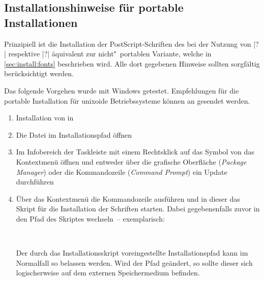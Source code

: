 \subsection{Installationshinweise für portable Installationen}
%
%

Prinzipiell ist die Installation der PostScript-Schriften des \CDs bei der 
Nutzung von |?| respektive  
|?| äquivalent zur nicht"~portablen 
Variante, welche in \autoref{sec:install:fonts} beschrieben wird. Alle dort 
gegebenen Hinweise sollten sorgfältig berücksichtigt werden.

Das folgende Vorgehen wurde mit Windows getestet. Empfehlungen für die portable 
Installation für unixoide Betriebssysteme können an \mailto{\tudscrmail} 
gesendet werden.
\begin{enumerate}
\item Installation von  in 
\item Die Datei  im Installationspfad öffnen
\item Im Infobereich der Taskleiste mit einem Rechtsklick auf das Symbol von 
   das Kontextmenü öffnen und entweder 
  über die grafische Oberfläche (\emph{Package Manager}) oder die Kommandozeile 
  (\emph{Command Prompt}) ein Update durchführen
\item Über das Kontextmenü die Kommandozeile ausführen und in dieser das Skript 
  für die Installation der Schriften  starten. 
  Dabei gegebenenfalls zuvor in den Pfad des Skriptes wechseln~-- exemplarisch:
  \begin{quoting}[leftmargin=1.5em,rightmargin=0pt]
  \newline%
  \,
  \end{quoting}
  Der durch das Installationsskript voreingestellte Installationspfad kann im 
  Normalfall so belassen werden. Wird der Pfad geändert, so sollte dieser sich 
  logischerweise auf dem externen Speichermedium 
   befinden.
\end{enumerate}

